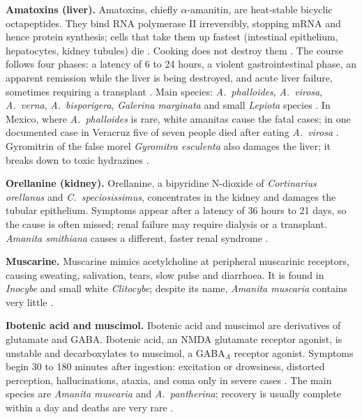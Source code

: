 \textbf{Amatoxins (liver).}
Amatoxins, chiefly $\alpha$-amanitin, are
heat-stable bicyclic octapeptides. They bind
RNA polymerase II irreversibly, stopping
mRNA and hence protein synthesis; cells that
take them up fastest (intestinal epithelium,
hepatocytes, kidney tubules) die
\cite{graeme2014mycetism}. Cooking does not
destroy them
\cite[pp.~106--107]{hall2003edible}.
The course follows four phases: a latency of
6 to 24 hours, a violent gastrointestinal
phase, an apparent remission while the liver
is being destroyed, and acute liver failure,
sometimes requiring a transplant
\cite{graeme2014mycetism}. Main species:
\emph{A.\ phalloides}, \emph{A.\ virosa},
\emph{A.\ verna}, \emph{A.\ bisporigera},
\emph{Galerina marginata} and small
\emph{Lepiota} species
\cite[pp.~106--107]{hall2003edible}. In
Mexico, where \emph{A.\ phalloides} is rare,
white amanitas cause the fatal cases; in one
documented case in Veracruz five of seven
people died after eating \emph{A.\ virosa}
\cite{perezmoreno1994multiple}. Gyromitrin
of the false morel \emph{Gyromitra
esculenta} also damages the liver; it breaks
down to toxic hydrazines
\cite[pp.~107--108]{hall2003edible}.

\textbf{Orellanine (kidney).}
Orellanine, a bipyridine N-dioxide of
\emph{Cortinarius orellanus} and \emph{C.\
speciosissimus}, concentrates in the kidney
and damages the tubular epithelium. Symptoms
appear after a latency of 36 hours to 21
days, so the cause is often missed; renal
failure may require dialysis or a
transplant. \emph{Amanita smithiana} causes
a different, faster renal syndrome
\cite{graeme2014mycetism}.

\textbf{Muscarine.}
Muscarine mimics acetylcholine at peripheral
muscarinic receptors, causing sweating,
salivation, tears, slow pulse and diarrhoea.
It is found in \emph{Inocybe} and small white
\emph{Clitocybe}; despite its name,
\emph{Amanita muscaria} contains very little
\cite{graeme2014mycetism}.

\textbf{Ibotenic acid and muscimol.}
Ibotenic acid and muscimol are derivatives of
glutamate and GABA. Ibotenic acid, an NMDA
glutamate receptor agonist, is unstable and
decarboxylates to muscimol, a GABA$_A$
receptor agonist. Symptoms begin 30 to 180
minutes after ingestion: excitation or
drowsiness, distorted perception,
hallucinations, ataxia, and coma only in
severe cases \cite{graeme2014mycetism}. The
main species are \emph{Amanita muscaria} and
\emph{A.\ pantherina}; recovery is usually
complete within a day and deaths are very
rare \cite{michelot2003amanita}.


